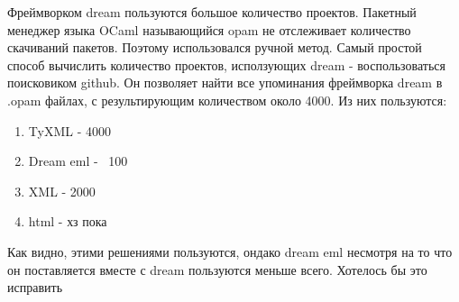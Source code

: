 
Фреймворком dream пользуются большое количество проектов.
Пакетный менеджер языка OCaml называющийся opam не отслеживает количество скачиваний пакетов. Поэтому использовался ручной метод.
Самый простой способ вычислить количество проектов, исползующих dream - воспользоваться поисковиком github.
Он позволяет найти все упоминания фреймворка dream в .opam файлах, с результирующим количеством около 4000.
Из них пользуются:

\begin{enumerate}
    \item TyXML - 4000
    \item Dream eml - ~100
    \item XML - 2000
    \item html - хз пока
\end{enumerate}


Как видно, этими решениями пользуются, ондако dream eml несмотря на то что он поставляется вместе с dream пользуются меньше всего.
Хотелось бы это исправить


